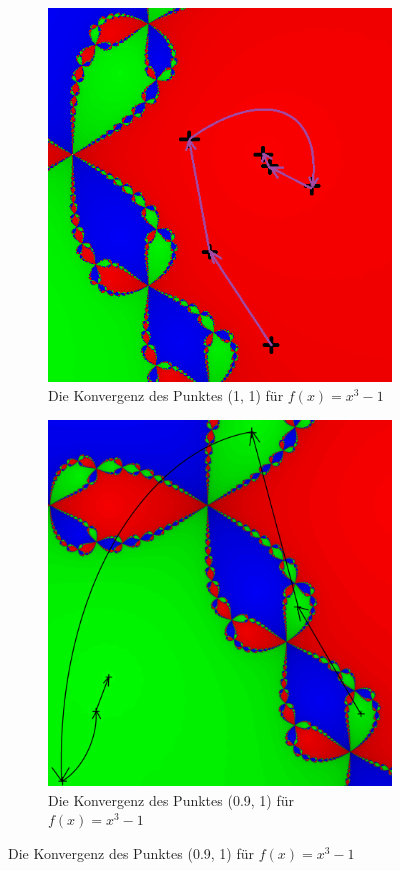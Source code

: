 \documentclass[a4paper,12pt]{llncs}
\numberwithin{equation}{section}
\begin{document}
\begin{figure}[ht]   
	\begin{subfigure}{.5\textwidth}
	\centering
		\includegraphics[width=.7\linewidth]{figures/output_points3}
		\captionsetup{width=0.8\textwidth}
		\caption{Die Konvergenz des Punktes (1, 1) für $f(x)=x^3-1$ }
		\label{fig:output_points3}
	\end{subfigure}%
	\begin{subfigure}{.5\textwidth}
  	\centering
		\includegraphics[width=.7\linewidth]{figures/output_points_g3}
		\captionsetup{width=0.8\textwidth}
		\caption{Die Konvergenz des Punktes (0.9, 1) für $f(x)=x^3-1$ }
		\label{fig:output_points_g3}
	\end{subfigure}%
\end{figure}
\end{document}
